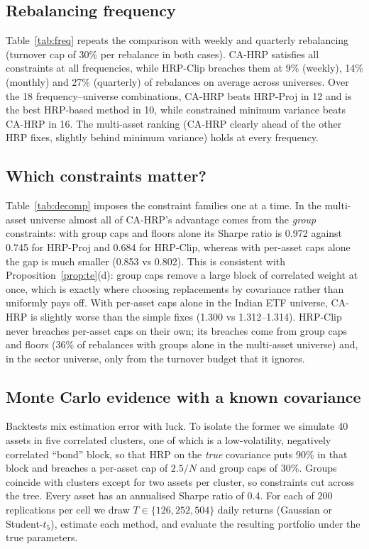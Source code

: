 \subsection{Rebalancing frequency}
Table~\ref{tab:freq} repeats the comparison with weekly and quarterly rebalancing (turnover
cap of 30\% per rebalance in both cases). CA-HRP satisfies all constraints at all
frequencies, while HRP-Clip breaches them at 9\% (weekly), 14\% (monthly) and 27\%
(quarterly) of rebalances on average across universes. Over the 18 frequency--universe
combinations, CA-HRP beats HRP-Proj in 12 and is the best HRP-based method in 10, while
constrained minimum variance beats CA-HRP in 16. The multi-asset ranking (CA-HRP clearly
ahead of the other HRP fixes, slightly behind minimum variance) holds at every frequency.



\subsection{Which constraints matter?}
Table~\ref{tab:decomp} imposes the constraint families one at a time. In the multi-asset
universe almost all of CA-HRP's advantage comes from the \emph{group} constraints: with
group caps and floors alone its Sharpe ratio is 0.972 against 0.745 for HRP-Proj and 0.684
for HRP-Clip, whereas with per-asset caps alone the gap is much smaller (0.853 vs 0.802).
This is consistent with Proposition~\ref{prop:te}(d): group caps remove a large block of
correlated weight at once, which is exactly where choosing replacements by covariance
rather than uniformly pays off. With per-asset caps alone in the Indian ETF universe,
CA-HRP is slightly worse than the simple fixes (1.300 vs 1.312--1.314). HRP-Clip never breaches
per-asset caps on their own; its breaches come from group caps and floors (36\% of
rebalances with groups alone in the multi-asset universe) and, in the sector universe, only
from the turnover budget that it ignores.



\subsection{Monte Carlo evidence with a known covariance}
Backtests mix estimation error with luck. To isolate the former we simulate 40 assets in
five correlated clusters, one of which is a low-volatility, negatively correlated ``bond''
block, so that HRP on the \emph{true} covariance puts 90\% in that block and breaches a
per-asset cap of $2.5/N$ and group caps of 30\%. Groups coincide with clusters except for two
assets per cluster, so constraints cut across the tree. Every asset has an annualised Sharpe
ratio of 0.4. For each of 200 replications per cell we draw $T\in\{126,252,504\}$ daily
returns (Gaussian or Student-$t_5$), estimate each method, and evaluate the resulting
portfolio under the true parameters.

